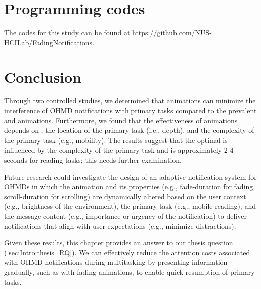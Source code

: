 \section{Programming codes}
\label{sec:GradNotif:programming_codes}

\begin{sloppypar}
The codes for this study can be found at \url{https://github.com/NUS-HCILab/FadingNotifications}. 
\end{sloppypar}

\section{Conclusion}

Through two controlled studies, we determined that \fading{} animations can minimize the interference of OHMD notifications with primary tasks compared to the prevalent \instant{} and \scroll{} animations. Furthermore, we found that the effectiveness of \fading{} animations depends on \fadeduration{}, the location of the primary task (i.e., depth), and the complexity of the primary task (e.g., mobility). The results suggest that the optimal \fadeduration{} is influenced by the complexity of the primary task and is approximately 2-4 seconds for reading tasks; this needs further examination.

Future research could investigate the design of an adaptive notification system for OHMDs in which the animation and its properties (e.g., fade-duration for fading, scroll-duration for scrolling) are dynamically altered based on the user context (e.g., brightness of the environment), the primary task (e.g., mobile reading), and the message content (e.g., importance or urgency of the notification) to deliver notifications that align with user expectations (e.g., minimize distractions).

Given these results, this chapter provides an answer to our thesis question (\autoref{sec:Intro:thesis_RQ}). We can effectively reduce the attention costs associated with OHMD notifications during multitasking by presenting information gradually, such as with fading animations, to enable quick resumption of primary tasks.

